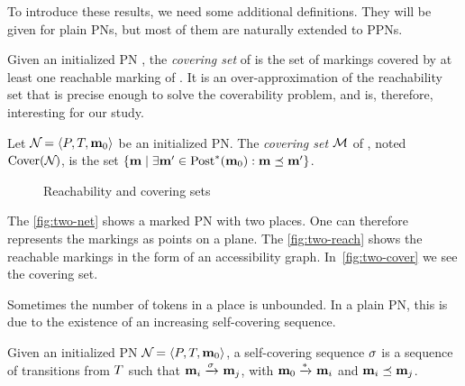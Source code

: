 To introduce these results, we need some additional definitions.
They will be given for plain \acp{PN}, but most of them are naturally extended to \acp{PPN}.

Given an initialized \ac{PN} \namePN, the \emph{covering set} of \namePN is the set of markings covered by at least one reachable marking of \namePN.
It is an over-approximation of the reachability set that is precise enough to solve the coverability problem, and is, therefore, interesting for our study.

\begin{defi}
  Let $\defPN$ be an initialized \ac{PN}.
  The \emph{covering set} $\mathcal{M}$ of \namePN, noted $\operatorname{Cover}(\mathcal{N}_{})$, is the set $\left\{\mathbf{m} \mid \exists \mathbf{m}' \in \operatorname{Post}^*_{{}}(\mathbf{m}_0) : \mathbf{m} \preceq \mathbf{m}' \right\}$.
\end{defi}

\begin{figure}[htbp]
  \label{fig:reach-and-cover-example}
  \centering
  \subfloat[A \ac{PN} ($\card{\places} = 2$)]{
    \label{fig:two-net}
    

  }

  \qquad
  \caption{Reachability and covering sets}
\end{figure}

The \cref{fig:two-net} shows a marked \ac{PN} with two places.
One can therefore represents the markings as points on a plane.
The \cref{fig:two-reach} shows the reachable markings in the form of an accessibility graph.
In~\ref{fig:two-cover} we see the covering set.

Sometimes the number of tokens in a place is unbounded. %
In a plain \ac{PN}, this is due to the existence of an increasing self-covering sequence.
\begin{defi}
  Given an initialized \ac{PN} $\defPN$,
  a self-covering sequence $\seqt$ is a sequence of transitions from $T$ such that
  \(
    \mar_i \fire{\seqt} \mar_j
  \),
  with $\mathbf{m}_0 \xrightarrow{*}_{} \mathbf{m}_i$ %
  and $\mathbf{m}_i \preceq \mathbf{m}_j$.
\end{defi}

